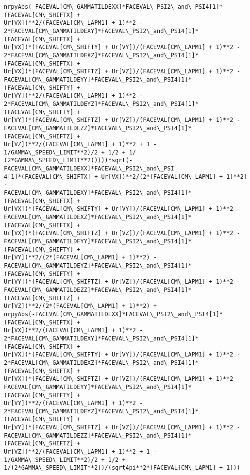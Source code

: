 \documentclass[landscape,letterpaper,10pt,english]{article}
\begin{document}
\begin{Verbatim}[commandchars=\\\{\}]
nrpyAbs(-FACEVAL[CM\_GAMMATILDEXX]*FACEVAL\_PSI2\_and\_PSI4[1]*(FACEVAL[CM\_SHIFTX] +
Ur[VX])**2/(FACEVAL[CM\_LAPM1] + 1)**2 -
2*FACEVAL[CM\_GAMMATILDEXY]*FACEVAL\_PSI2\_and\_PSI4[1]*(FACEVAL[CM\_SHIFTX] +
Ur[VX])*(FACEVAL[CM\_SHIFTY] + Ur[VY])/(FACEVAL[CM\_LAPM1] + 1)**2 -
2*FACEVAL[CM\_GAMMATILDEXZ]*FACEVAL\_PSI2\_and\_PSI4[1]*(FACEVAL[CM\_SHIFTX] +
Ur[VX])*(FACEVAL[CM\_SHIFTZ] + Ur[VZ])/(FACEVAL[CM\_LAPM1] + 1)**2 -
FACEVAL[CM\_GAMMATILDEYY]*FACEVAL\_PSI2\_and\_PSI4[1]*(FACEVAL[CM\_SHIFTY] +
Ur[VY])**2/(FACEVAL[CM\_LAPM1] + 1)**2 -
2*FACEVAL[CM\_GAMMATILDEYZ]*FACEVAL\_PSI2\_and\_PSI4[1]*(FACEVAL[CM\_SHIFTY] +
Ur[VY])*(FACEVAL[CM\_SHIFTZ] + Ur[VZ])/(FACEVAL[CM\_LAPM1] + 1)**2 -
FACEVAL[CM\_GAMMATILDEZZ]*FACEVAL\_PSI2\_and\_PSI4[1]*(FACEVAL[CM\_SHIFTZ] +
Ur[VZ])**2/(FACEVAL[CM\_LAPM1] + 1)**2 + 1 - 1/GAMMA\_SPEED\_LIMIT**2)/2 + 1/2 + 1/
(2*GAMMA\_SPEED\_LIMIT**2)))))*sqrt(-FACEVAL[CM\_GAMMATILDEXX]*FACEVAL\_PSI2\_and\_PSI
4[1]*(FACEVAL[CM\_SHIFTX] + Ur[VX])**2/(2*(FACEVAL[CM\_LAPM1] + 1)**2) -
FACEVAL[CM\_GAMMATILDEXY]*FACEVAL\_PSI2\_and\_PSI4[1]*(FACEVAL[CM\_SHIFTX] +
Ur[VX])*(FACEVAL[CM\_SHIFTY] + Ur[VY])/(FACEVAL[CM\_LAPM1] + 1)**2 -
FACEVAL[CM\_GAMMATILDEXZ]*FACEVAL\_PSI2\_and\_PSI4[1]*(FACEVAL[CM\_SHIFTX] +
Ur[VX])*(FACEVAL[CM\_SHIFTZ] + Ur[VZ])/(FACEVAL[CM\_LAPM1] + 1)**2 -
FACEVAL[CM\_GAMMATILDEYY]*FACEVAL\_PSI2\_and\_PSI4[1]*(FACEVAL[CM\_SHIFTY] +
Ur[VY])**2/(2*(FACEVAL[CM\_LAPM1] + 1)**2) -
FACEVAL[CM\_GAMMATILDEYZ]*FACEVAL\_PSI2\_and\_PSI4[1]*(FACEVAL[CM\_SHIFTY] +
Ur[VY])*(FACEVAL[CM\_SHIFTZ] + Ur[VZ])/(FACEVAL[CM\_LAPM1] + 1)**2 -
FACEVAL[CM\_GAMMATILDEZZ]*FACEVAL\_PSI2\_and\_PSI4[1]*(FACEVAL[CM\_SHIFTZ] +
Ur[VZ])**2/(2*(FACEVAL[CM\_LAPM1] + 1)**2) +
nrpyAbs(-FACEVAL[CM\_GAMMATILDEXX]*FACEVAL\_PSI2\_and\_PSI4[1]*(FACEVAL[CM\_SHIFTX] +
Ur[VX])**2/(FACEVAL[CM\_LAPM1] + 1)**2 -
2*FACEVAL[CM\_GAMMATILDEXY]*FACEVAL\_PSI2\_and\_PSI4[1]*(FACEVAL[CM\_SHIFTX] +
Ur[VX])*(FACEVAL[CM\_SHIFTY] + Ur[VY])/(FACEVAL[CM\_LAPM1] + 1)**2 -
2*FACEVAL[CM\_GAMMATILDEXZ]*FACEVAL\_PSI2\_and\_PSI4[1]*(FACEVAL[CM\_SHIFTX] +
Ur[VX])*(FACEVAL[CM\_SHIFTZ] + Ur[VZ])/(FACEVAL[CM\_LAPM1] + 1)**2 -
FACEVAL[CM\_GAMMATILDEYY]*FACEVAL\_PSI2\_and\_PSI4[1]*(FACEVAL[CM\_SHIFTY] +
Ur[VY])**2/(FACEVAL[CM\_LAPM1] + 1)**2 -
2*FACEVAL[CM\_GAMMATILDEYZ]*FACEVAL\_PSI2\_and\_PSI4[1]*(FACEVAL[CM\_SHIFTY] +
Ur[VY])*(FACEVAL[CM\_SHIFTZ] + Ur[VZ])/(FACEVAL[CM\_LAPM1] + 1)**2 -
FACEVAL[CM\_GAMMATILDEZZ]*FACEVAL\_PSI2\_and\_PSI4[1]*(FACEVAL[CM\_SHIFTZ] +
Ur[VZ])**2/(FACEVAL[CM\_LAPM1] + 1)**2 + 1 - 1/GAMMA\_SPEED\_LIMIT**2)/2 + 1/2 +
1/(2*GAMMA\_SPEED\_LIMIT**2))/(sqrt4pi**2*(FACEVAL[CM\_LAPM1] + 1)))

\end{Verbatim}
\end{document}
